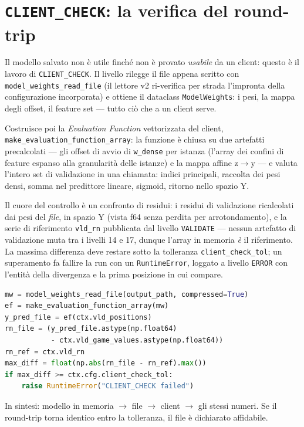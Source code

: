 \section{\texttt{CLIENT\_CHECK}: la verifica del round-trip}

Il modello salvato non è utile finché non è provato \emph{usabile} da un
client: questo è il lavoro di \texttt{CLIENT\_CHECK}. Il livello rilegge il
file appena scritto con \texttt{model\_weights\_read\_file} (il lettore v2
ri-verifica per strada l'impronta della configurazione incorporata) e
ottiene il dataclass \texttt{ModelWeights}: i pesi, la mappa degli offset,
il feature set — tutto ciò che a un client serve.

Costruisce poi la \emph{Evaluation Function} vettorizzata del client,
\texttt{make\_evaluation\_function\_array}: la funzione è chiusa su due
artefatti precalcolati — gli offset di avvio di \texttt{w\_dense} per
istanza (l'array dei confini di feature espanso alla granularità delle
istanze) e la mappa affine $\mathrm{z}\to\mathrm{y}$ — e valuta l'intero
set di validazione in una chiamata: indici principali, raccolta dei pesi
densi, somma nel predittore lineare, sigmoid, ritorno nello spazio Y.

Il cuore del controllo è un confronto di residui: i residui di validazione
ricalcolati dai pesi del \emph{file}, in spazio Y (vista f64 senza perdita
per arrotondamento), e la serie di riferimento \texttt{vld\_rn} pubblicata
dal livello \texttt{VALIDATE} — nessun artefatto di validazione muta tra i
livelli 14 e 17, dunque l'array in memoria \emph{è} il riferimento. La
massima differenza deve restare sotto la tolleranza
\texttt{client\_check\_tol}; un superamento fa fallire la run con un
\texttt{RuntimeError}, loggato a livello \texttt{ERROR} con l'entità della
divergenza e la prima posizione in cui compare.

\begin{lstlisting}[language=python,
caption={Il confronto del round-trip (estratto di \texttt{wrk\_client\_check}).}]
mw = model_weights_read_file(output_path, compressed=True)
ef = make_evaluation_function_array(mw)
y_pred_file = ef(ctx.vld_positions)
rn_file = (y_pred_file.astype(np.float64)
           - ctx.vld_game_values.astype(np.float64))
rn_ref = ctx.vld_rn
max_diff = float(np.abs(rn_file - rn_ref).max())
if max_diff >= ctx.cfg.client_check_tol:
    raise RuntimeError("CLIENT_CHECK failed")
\end{lstlisting}

In sintesi: modello in memoria $\to$ file $\to$ client $\to$ gli stessi
numeri. Se il round-trip torna identico entro la tolleranza, il file è
dichiarato affidabile.

